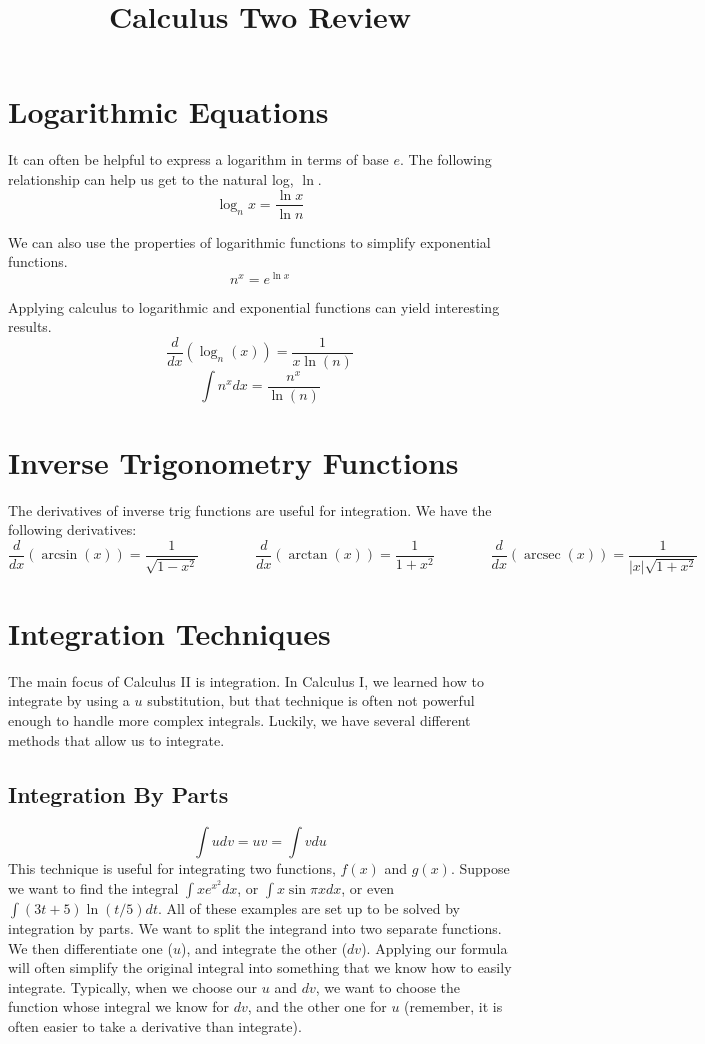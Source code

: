 \documentclass{article}
\title{Calculus Two Review}
\date{}
\DeclareMathOperator{\arcsec}{arcsec}
\begin{document}
\section{Logarithmic Equations}
\begin{minipage}[t]{0.3\textwidth}
It can often be helpful to express a logarithm in terms of base $e$.
The following relationship can help us get to the natural log, $\ln$.
\[\log_{n}x = \frac{\ln{x}}{\ln{n}}\]
\end{minipage}
\hspace{0.5cm}
\begin{minipage}[t]{0.3\textwidth}
We can also use the properties of logarithmic functions to simplify exponential functions.
\[n^{x} = e^{\ln{x}}\]
\end{minipage}
\hspace{0.5cm}
\begin{minipage}[t]{0.3\textwidth}
Applying calculus to logarithmic and exponential functions can yield interesting results.
\[\frac{d}{dx}(\log_{n}{(x)}) = \frac{1}{x\ln{(n)}}\]
\[\int n^{x}dx = \frac{n^{x}}{\ln{(n)}}\]
\end{minipage}


\section{Inverse Trigonometry Functions}
The derivatives of inverse trig functions are useful for integration.
We have the following derivatives:
\[
\frac{d}{dx}(\arcsin{(x)}) = \frac{1}{\sqrt{1-x^{2}}}\qquad\qquad
\frac{d}{dx}(\arctan{(x)}) = \frac{1}{1+x^{2}}\qquad\qquad
\frac{d}{dx}(\arcsec{(x)}) = \frac{1}{|x|\sqrt{1+x^{2}}}
\]


\section{Integration Techniques}
The main focus of Calculus II is integration.
In Calculus I, we learned how to integrate by using a $u$ substitution, but that technique is often not powerful enough to handle more complex integrals.
Luckily, we have several different methods that allow us to integrate.
\subsection{Integration By Parts}
\[\int u dv = uv = \int v du\]
This technique is useful for integrating two functions, $f(x)$ and $g(x)$.
Suppose we want to find the integral $\int xe^{x^{2}}dx$, or $\int x\sin{\pi x}dx$, or even $\int (3t + 5)\ln{(t/5)}dt$.
All of these examples are set up to be solved by integration by parts.
We want to split the integrand into two separate functions.
We then differentiate one ($u$), and integrate the other ($dv$).
Applying our formula will often simplify the original integral into something that we know how to easily integrate.
Typically, when we choose our $u$ and $dv$, we want to choose the function whose integral we know for $dv$, and the other one for $u$ (remember, it is often easier to take a derivative than integrate).
\end{document}
